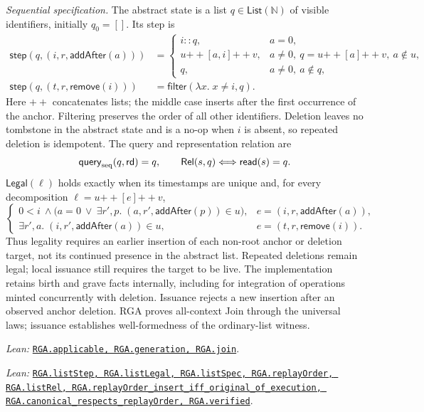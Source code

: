 \documentclass[11pt]{article}
\theoremstyle{definition}
\newcommand{\N}{\mathbb N}
\newcommand{\src}[2]{\href{../../#1}{\texttt{#2}}}
\newcommand{\anchor}[2]{\par\smallskip\noindent\emph{Lean: }\src{#1}{#2}.}
\begin{document}
\emph{Sequential specification.} The abstract state is a list $q\in\mathsf{List}(\N)$
of visible identifiers, initially $q_0=[]$. Its step is
\[
\begin{aligned}
 \mathsf{step}(q,(i,r,\mathsf{addAfter}(a)))
 &=\begin{cases}
 i::q, & a=0,\\
 u\mathbin{+\!+}[a,i]\mathbin{+\!+}v,
   & a\ne0,\ q=u\mathbin{+\!+}[a]\mathbin{+\!+}v,\ a\notin u,\\
 q, & a\ne0,\ a\notin q,
 \end{cases}\\
 \mathsf{step}(q,(t,r,\mathsf{remove}(i)))
 &=\mathsf{filter}(\lambda x.\;x\ne i,q).
\end{aligned}
\]
Here $+\!+$ concatenates lists; the middle case inserts after the first
occurrence of the anchor. Filtering preserves the order of all other
identifiers. Deletion leaves no tombstone in the abstract state and is a
no-op when $i$ is absent, so repeated deletion is idempotent.
The query and representation relation are
\[
 \mathsf{query}_{\rm seq}(q,\mathsf{rd})=q,
 \qquad
 \mathsf{Rel}(s,q)\Longleftrightarrow\mathsf{read}(s)=q.
\]
$\mathsf{Legal}(\ell)$ holds exactly when its timestamps are unique and, for
every decomposition $\ell=u\mathbin{+\!+}[e]\mathbin{+\!+}v$,
\[
\begin{cases}
 0<i\ \land\bigl(a=0\ \lor\ \exists r',p.\;(a,r',\mathsf{addAfter}(p))\in u\bigr),
   & e=(i,r,\mathsf{addAfter}(a)),\\
 \exists r',a.\;(i,r',\mathsf{addAfter}(a))\in u,
   & e=(t,r,\mathsf{remove}(i)).
\end{cases}
\]
Thus legality requires an earlier insertion of each non-root anchor or
deletion target, not its continued presence in the abstract list. Repeated
deletions remain legal; local issuance still requires the target to be live.
The implementation retains birth and grave facts internally, including for
integration of operations minted concurrently with deletion. Issuance rejects a new insertion after an
observed anchor deletion.
RGA proves
all-context Join
through the universal laws; issuance establishes well-formedness of the
ordinary-list witness.
\anchor{Sal/MRDTs/Instances/RGA.lean}
  {RGA.applicable, RGA.generation, RGA.join}
\anchor{Sal/MRDTs/Instances/RGASequential.lean}
  {RGA.listStep, RGA.listLegal, RGA.listSpec, RGA.replayOrder, RGA.listRel,
   RGA.replayOrder\_insert\_iff\_original\_of\_execution,
   RGA.canonical\_respects\_replayOrder, RGA.verified}
\end{document}
